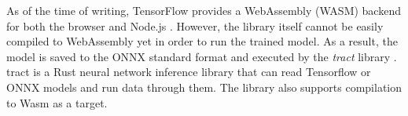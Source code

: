 As of the time of writing, TensorFlow provides a WebAssembly (WASM) backend for both the browser and Node.js \cite{tf-wasm}. However, the library itself cannot be easily compiled to WebAssembly yet in order to run the trained model. As a result, the model is saved to the ONNX \cite{onnx} standard format and executed by the \emph{tract} library \cite{tract}. tract is a Rust neural network inference library that can read Tensorflow or ONNX models and run data through them. The library also supports compilation to Wasm as a target.






